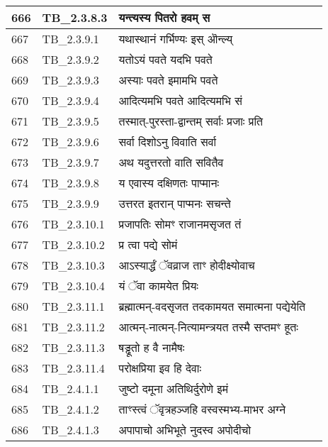 \documentclass[17pt]{extarticle}
\begin{document}
\begin{longtable}{||p{0.4in}||p{0.9in}||p{4.0in}||p{0.9in}||}
        \hline
            666 & TB\_2.3.8.3 & यन्त्यस्य पितरो हवम् स &      \\
        \hline
            667 & TB\_2.3.9.1 & यथास्थानं गर्भिण्यः इस् ऒन्ल्य् &      \\
        \hline
            668 & TB\_2.3.9.2 & यतोऽयं पवते यदभि पवते &      \\
        \hline
            669 & TB\_2.3.9.3 & अस्याः पवते इमामभि पवते &      \\
        \hline
            670 & TB\_2.3.9.4 & आदित्यमभि पवते आदित्यमभि सं &      \\
        \hline
            671 & TB\_2.3.9.5 & तस्मात्{-}पुरस्ता{-}द्वान्तम् सर्वाः प्रजाः प्रति &      \\
        \hline
            672 & TB\_2.3.9.6 & सर्वा दिशोऽनु विवाति सर्वा &      \\
        \hline
            673 & TB\_2.3.9.7 & अथ यदुत्तरतो वाति सवितैव &      \\
        \hline
            674 & TB\_2.3.9.8 & य एवास्य दक्षिणतः पाप्मानः &      \\
        \hline
            675 & TB\_2.3.9.9 & उत्तरत इतरान् पाप्मनः सचन्ते &      \\
        \hline
            676 & TB\_2.3.10.1 & प्रजापतिः सोमꣳ राजानमसृजत तं &      \\
        \hline
            677 & TB\_2.3.10.2 & प्र त्वा पद्ये सोमं &      \\
        \hline
            678 & TB\_2.3.10.3 & आऽस्यार्द्धं ॅवव्राज ताꣳ होदीक्ष्योवाच &      \\
        \hline
            679 & TB\_2.3.10.4 & यं ॅवा कामयेत प्रियः &      \\
        \hline
            680 & TB\_2.3.11.1 & ब्रह्मात्मन्{-}वदसृजत तदकामयत समात्मना पद्येयेति &      \\
        \hline
            681 & TB\_2.3.11.2 & आत्मन्{-}नात्मन्{-}नित्यामन्त्रयत तस्मै सप्तमꣳ हूतः &      \\
        \hline
            682 & TB\_2.3.11.3 & षड्ढूतो ह वै नामैषः &      \\
        \hline
            683 & TB\_2.3.11.4 & परोक्षप्रिया इव हि देवाः &      \\
        \hline
            684 & TB\_2.4.1.1 & जुष्टो दमूना अतिथिर्दुरोणे इमं &      \\
        \hline
            685 & TB\_2.4.1.2 & ताꣳस्त्वं ॅवृत्रहञ्जहि वस्वस्मभ्य{-}माभर अग्ने &      \\
        \hline
            686 & TB\_2.4.1.3 & अपापाचो अभिभूते नुदस्व अपोदीचो &      \\

\end{longtable}
\end{document}
